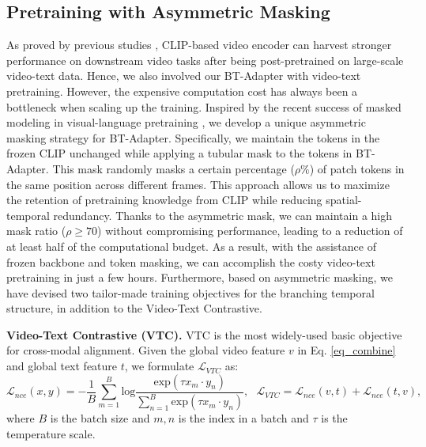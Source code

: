 \documentclass{article} \usepackage{iclr2024_conference,times}
\begin{document}
\subsection{Pretraining with Asymmetric Masking} \label{method_training}
As proved by previous studies \citep{zeng2023tvtsv2, wang2022internvideo, xue2022clip}, CLIP-based video encoder can harvest stronger performance on downstream video tasks after being post-pretrained on large-scale video-text data. Hence, we also involved our BT-Adapter with video-text pretraining. 
However, the expensive computation cost  has always been a bottleneck when scaling up the training. Inspired by the recent success of masked modeling in visual-language pretraining \citep{li2023scaling,tong2022videomae}, we develop a unique asymmetric masking strategy for BT-Adapter. Specifically, we maintain the tokens in the frozen CLIP unchanged while applying a tubular mask to the tokens in BT-Adapter. This mask randomly masks a certain percentage ($\rho\%$) of patch tokens in the same position across different frames. This approach allows us to maximize the retention of pretraining knowledge from CLIP while reducing spatial-temporal redundancy. Thanks to the asymmetric mask, we can maintain a high mask ratio ($\rho \ge 70$) without compromising performance, leading to a reduction of at least half of the computational budget. As a result, with the assistance of frozen backbone and token masking, we can accomplish the costy video-text pretraining in just a few hours.
Furthermore, based on asymmetric masking, we have devised two tailor-made training objectives for the branching temporal structure, in addition to the Video-Text Contrastive.

\noindent \textbf{Video-Text Contrastive (VTC).}  VTC is the most widely-used basic objective for cross-modal alignment. Given the global video feature $v$ in Eq. \ref{eq_combine} and global text feature $t$, we formulate $\mathcal{L}_{VTC}$ as:
\begin{equation}
     \mathcal{L}_{nce}(x,y) = - \frac{1}{B} \sum_{m=1}^B \mathrm{log} \frac{\mathrm{exp}(\tau x_{m} \cdot y_{n})}{\sum_{n=1}^B \mathrm{exp}(\tau x_{m} \cdot y_{n})} ,~~~ 
     \mathcal{L}_{VTC} = \mathcal{L}_{nce}(v,t) + \mathcal{L}_{nce}(t,v),
 \end{equation}
 where $B$ is the batch size and $m,n$ is the index in a batch and $\tau$ is the temperature scale.
\end{document}
